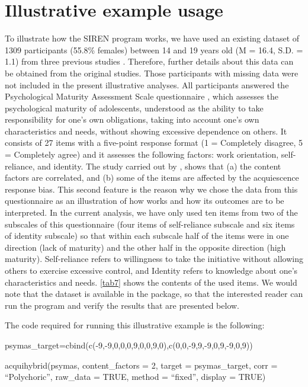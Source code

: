 \section{Illustrative example usage}

To illustrate how the SIREN program works, we have used an existing dataset of 1309 participants (55.8\% females) between 14 and 19 years old (M = 16.4, S.D. = 1.1) from three previous studies \citep{Morales-Vives:2018, Morales-Vives:2020, Morales-Vives:inpress}. Therefore, further details about this data can be obtained from the original studies. Those participants with missing data were not included in the present illustrative analyses. All participants answered the Psychological Maturity Assessment Scale questionnaire \citep[PSYMAS]{Morales-Vives:2013}, which assesses the psychological maturity of adolescents, understood as the ability to take responsibility for one's own obligations, taking into account one's own characteristics and needs, without showing excessive dependence on others. It consists of 27 items with a five-point response format (1 = Completely disagree, 5 = Completely agree) and it assesses the following factors: work orientation, self-reliance, and identity. The study carried out by  \citet{Morales-Vives:2013}, shows that (a) the content factors are correlated, and (b) some of the items are affected by the acquiescence response bias. This second feature is the reason why we chose the data from this questionnaire as an illustration of how  works and how its outcomes are to be interpreted. In the current analysis, we have only used ten items from two of the subscales of this questionnaire (four items of self-reliance subscale and six items of identity subscale) so that within each subscale half of the items were in one direction (lack of maturity) and the other half in the opposite direction (high maturity). Self-reliance refers to willingness to take the initiative without allowing others to exercise excessive control, and Identity refers to knowledge about one’s characteristics and needs. \cref{tab7} shows the contents of the used items. We would note that the dataset is available in the   package, so that the interested reader can run the program and verify the results that are presented below.

The code required for running this illustrative example is the following:

\begin{example}
  psymas_target=cbind(c(-9,-9,0,0,0,9,0,0,9,0),c(0,0,-9,9,-9,0,9,-9,0,9))

  acquihybrid(psymas, content_factors = 2, target = psymas_target,
    corr = “Polychoric”, raw_data = TRUE, method = “fixed”, display = TRUE)
\end{example}

